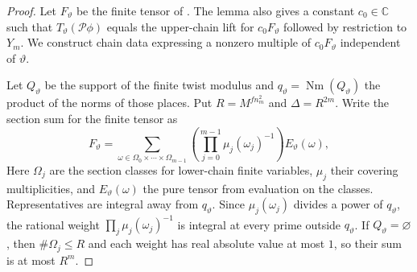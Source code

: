 \begin{proof}
Let $F_\vartheta$ be the finite tensor of . The lemma also gives a constant $c_0\in\mathbb C$ such that $T_\vartheta(\mathcal P\phi)$ equals the upper-chain lift for $c_0F_\vartheta$ followed by restriction to $Y_m$. We construct chain data expressing a nonzero multiple of $c_0F_\vartheta$ independent of $\vartheta$.

Let $Q_\vartheta$ be the support of the finite twist modulus and $q_\vartheta=\operatorname{Nm}(Q_\vartheta)$ the product of the norms of those places. Put $R=M^{f n_m^2}$ and $\Delta=R^{2m}$. Write the section sum for the finite tensor as
\[
 F_\vartheta=\sum_{\omega\in\Omega_0\times\cdots\times\Omega_{m-1}}
             \left(\prod_{j=0}^{m-1}\mu_j(\omega_j)^{-1}\right)
             E_\vartheta(\omega),
\]
Here $\Omega_j$ are the section classes for lower-chain finite variables, $\mu_j$ their covering multiplicities, and $E_\vartheta(\omega)$ the pure tensor from evaluation on the classes. Representatives are integral away from $q_\vartheta$. Since $\mu_j(\omega_j)$ divides a power of $q_\vartheta$, the rational weight $\prod_j\mu_j(\omega_j)^{-1}$ is integral at every prime outside $q_\vartheta$. If $Q_\vartheta=\varnothing$, then $\#\Omega_j\le R$ and each weight has real absolute value at most $1$, so their sum is at most $R^m$.


\end{proof}
